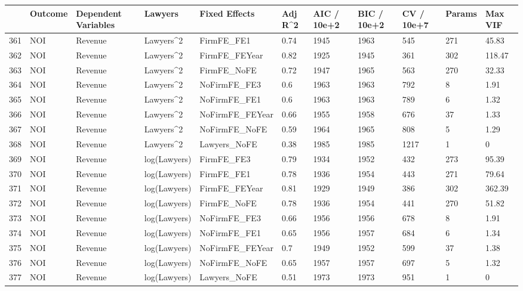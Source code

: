 \begin{table}[ht]
\centering
\begin{tabular}{rllllllllll}
  \hline
 & Outcome & Dependent Variables & Lawyers & Fixed Effects & Adj R^2 & AIC / 10e+2 & BIC / 10e+2 & CV / 10e+7 & Params & Max VIF \\ 
  \hline
361 & NOI & Revenue & Lawyers^2 & FirmFE\_FE1 & 0.74 & 1945 & 1963 & 545 & 271 & 45.83 \\ 
  362 & NOI & Revenue & Lawyers^2 & FirmFE\_FEYear & 0.82 & 1925 & 1945 & 361 & 302 & 118.47 \\ 
  363 & NOI & Revenue & Lawyers^2 & FirmFE\_NoFE & 0.72 & 1947 & 1965 & 563 & 270 & 32.33 \\ 
  364 & NOI & Revenue & Lawyers^2 & NoFirmFE\_FE3 & 0.6 & 1963 & 1963 & 792 & 8 & 1.91 \\ 
  365 & NOI & Revenue & Lawyers^2 & NoFirmFE\_FE1 & 0.6 & 1963 & 1963 & 789 & 6 & 1.32 \\ 
  366 & NOI & Revenue & Lawyers^2 & NoFirmFE\_FEYear & 0.66 & 1955 & 1958 & 676 & 37 & 1.33 \\ 
  367 & NOI & Revenue & Lawyers^2 & NoFirmFE\_NoFE & 0.59 & 1964 & 1965 & 808 & 5 & 1.29 \\ 
  368 & NOI & Revenue & Lawyers^2 & Lawyers\_NoFE & 0.38 & 1985 & 1985 & 1217 & 1 & 0 \\ 
  369 & NOI & Revenue & log(Lawyers) & FirmFE\_FE3 & 0.79 & 1934 & 1952 & 432 & 273 & 95.39 \\ 
  370 & NOI & Revenue & log(Lawyers) & FirmFE\_FE1 & 0.78 & 1936 & 1954 & 443 & 271 & 79.64 \\ 
  371 & NOI & Revenue & log(Lawyers) & FirmFE\_FEYear & 0.81 & 1929 & 1949 & 386 & 302 & 362.39 \\ 
  372 & NOI & Revenue & log(Lawyers) & FirmFE\_NoFE & 0.78 & 1936 & 1954 & 441 & 270 & 51.82 \\ 
  373 & NOI & Revenue & log(Lawyers) & NoFirmFE\_FE3 & 0.66 & 1956 & 1956 & 678 & 8 & 1.91 \\ 
  374 & NOI & Revenue & log(Lawyers) & NoFirmFE\_FE1 & 0.65 & 1956 & 1957 & 684 & 6 & 1.34 \\ 
  375 & NOI & Revenue & log(Lawyers) & NoFirmFE\_FEYear & 0.7 & 1949 & 1952 & 599 & 37 & 1.38 \\ 
  376 & NOI & Revenue & log(Lawyers) & NoFirmFE\_NoFE & 0.65 & 1957 & 1957 & 697 & 5 & 1.32 \\ 
  377 & NOI & Revenue & log(Lawyers) & Lawyers\_NoFE & 0.51 & 1973 & 1973 & 951 & 1 & 0 \\ 

\end{tabular}
\end{table}
